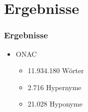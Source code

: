 \section{Ergebnisse}
\label{sec:ergebnisse}

\begin{frame}
  \frametitle{Ergebnisse}

  \begin{itemize}
  \item ONAC
    \begin{itemize}
    \item 11.934.180 Wörter
    \item 2.716 Hypernyme
    \item 21.028 Hyponyme
    \end{itemize}
  \end{itemize}
\end{frame}